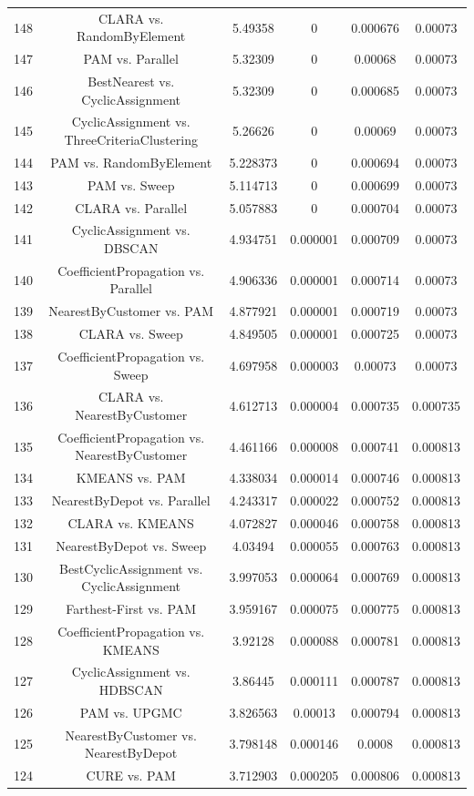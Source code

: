 \documentclass[a4paper,10pt]{article}
\begin{document}
\begin{landscape}
\begin{table}[!htp]
\begin{tabular}{cccccc}
148&CLARA vs. RandomByElement&5.49358&0&0.000676&0.00073\\
147&PAM vs. Parallel&5.32309&0&0.00068&0.00073\\
146&BestNearest vs. CyclicAssignment&5.32309&0&0.000685&0.00073\\
145&CyclicAssignment vs. ThreeCriteriaClustering&5.26626&0&0.00069&0.00073\\
144&PAM vs. RandomByElement&5.228373&0&0.000694&0.00073\\
143&PAM vs. Sweep&5.114713&0&0.000699&0.00073\\
142&CLARA vs. Parallel&5.057883&0&0.000704&0.00073\\
141&CyclicAssignment vs. DBSCAN&4.934751&0.000001&0.000709&0.00073\\
140&CoefficientPropagation vs. Parallel&4.906336&0.000001&0.000714&0.00073\\
139&NearestByCustomer vs. PAM&4.877921&0.000001&0.000719&0.00073\\
138&CLARA vs. Sweep&4.849505&0.000001&0.000725&0.00073\\
137&CoefficientPropagation vs. Sweep&4.697958&0.000003&0.00073&0.00073\\
136&CLARA vs. NearestByCustomer&4.612713&0.000004&0.000735&0.000735\\
135&CoefficientPropagation vs. NearestByCustomer&4.461166&0.000008&0.000741&0.000813\\
134&KMEANS vs. PAM&4.338034&0.000014&0.000746&0.000813\\
133&NearestByDepot vs. Parallel&4.243317&0.000022&0.000752&0.000813\\
132&CLARA vs. KMEANS&4.072827&0.000046&0.000758&0.000813\\
131&NearestByDepot vs. Sweep&4.03494&0.000055&0.000763&0.000813\\
130&BestCyclicAssignment vs. CyclicAssignment&3.997053&0.000064&0.000769&0.000813\\
129&Farthest-First vs. PAM&3.959167&0.000075&0.000775&0.000813\\
128&CoefficientPropagation vs. KMEANS&3.92128&0.000088&0.000781&0.000813\\
127&CyclicAssignment vs. HDBSCAN&3.86445&0.000111&0.000787&0.000813\\
126&PAM vs. UPGMC&3.826563&0.00013&0.000794&0.000813\\
125&NearestByCustomer vs. NearestByDepot&3.798148&0.000146&0.0008&0.000813\\
124&CURE vs. PAM&3.712903&0.000205&0.000806&0.000813\\

\end{tabular}
\end{table}
\end{landscape}
\end{document}
